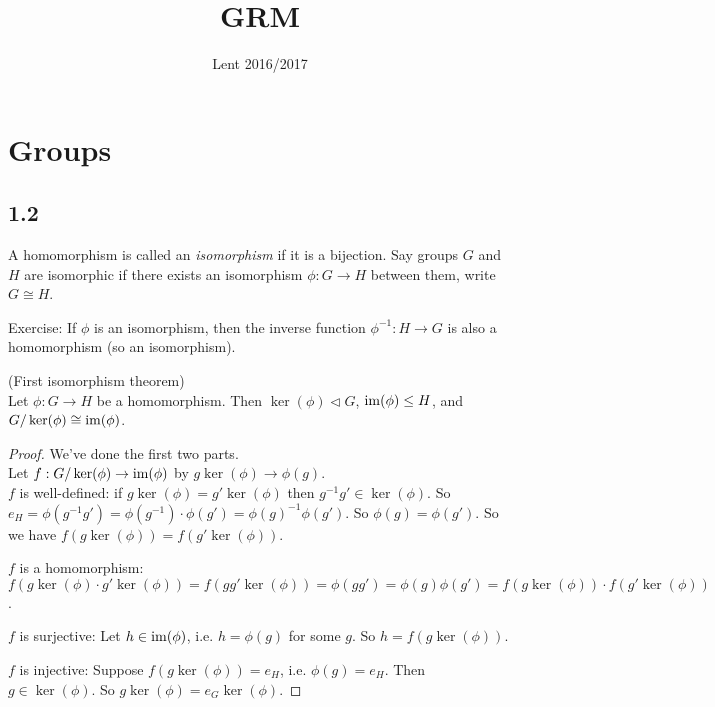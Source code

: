 \documentclass[a4paper]{article}
\begin{document}
\title{GRM}
\date{Lent 2016/2017}

\maketitle

\newpage

\tableofcontents

\newpage

\section{Groups}

\subsection{1.2}

\begin{defi}
A homomorphism is called an \emph{isomorphism} if it is a bijection. Say groups $G$ and $H$ are isomorphic if there exists an isomorphism $\phi:G \to H$ between them, write $G \cong H$.
\end{defi}

Exercise: If $\phi$ is an isomorphism, then the inverse function $\phi^{-1}: H \to G$ is also a homomorphism (so an isomorphism).

\begin{thm} (First isomorphism theorem)\\
Let $\phi:G \to H$ be a homomorphism. Then $\ker(\phi) \triangleleft G$, $\operatorname{im}(\phi) \leq H$, and $G/\ker(\phi) \cong \operatorname{im}(\phi)$.
\begin{proof}
We've done the first two parts.\\
Let $f:G/\ker(\phi) \to \operatorname{im}(\phi)$ by $g\ker(\phi) \to \phi(g)$.\\
$f$ is well-defined: if $g\ker(\phi) = g'\ker(\phi)$ then $g^{-1}g' \in \ker(\phi)$. So $e_H = \phi(g^{-1}g')=\phi(g^{-1}) \cdot \phi(g') = \phi(g)^{-1} \phi(g')$. So $\phi(g) = \phi(g')$. So we have $f(g\ker(\phi)) = f(g'\ker(\phi))$.

$f$ is a homomorphism: $f(g\ker(\phi)\cdot g'\ker(\phi)) = f(gg'\ker(\phi)) = \phi(gg') = \phi(g)\phi(g') = f(g\ker(\phi))\cdot f(g'\ker(\phi))$.

$f$ is surjective: Let $h \in \operatorname{im}(\phi)$, i.e. $h=\phi(g)$ for some $g$. So $h=f(g\ker(\phi))$.

$f$ is injective: Suppose $f(g\ker(\phi)) = e_H$, i.e. $\phi(g)=e_H$. Then $g \in \ker(\phi)$. So $g\ker(\phi) = e_G \ker(\phi)$.
\end{proof}
\end{thm}
\end{document}
